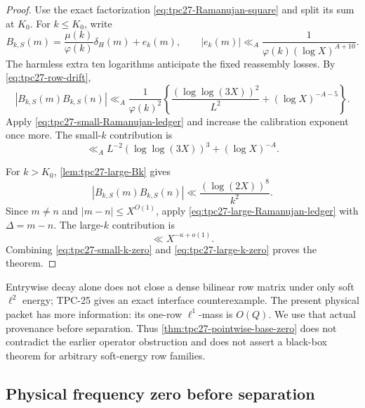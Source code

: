 \begin{proof}
Use the exact factorization
\eqref{eq:tpc27-Ramanujan-square} and split its sum at \(K_0\).
For \(k\le K_0\), write
\begin{equation}
 B_{k,S}(m)=
 \frac{\mu(k)}{\varphi(k)}\delta_H(m)+e_k(m),
 \qquad
 |e_k(m)|\ll_A
 \frac1{\varphi(k)(\log X)^{A+10}}.
 \label{eq:tpc27-small-B-error}
\end{equation}
The harmless extra ten logarithms anticipate the fixed reassembly
losses.  By \eqref{eq:tpc27-row-drift},
\begin{equation}
 |B_{k,S}(m)B_{k,S}(n)|
 \ll_A\frac1{\varphi(k)^2}
 \left\{
 \frac{(\log\log(3X))^2}{L^2}
 +(\log X)^{-A-5}
 \right\}.
 \label{eq:tpc27-small-product}
\end{equation}
Apply \eqref{eq:tpc27-small-Ramanujan-ledger} and increase the
calibration exponent once more.  The small-\(k\) contribution is
\begin{equation}
 \ll_A
 L^{-2}(\log\log(3X))^3+(\log X)^{-A}.
 \label{eq:tpc27-small-k-zero}
\end{equation}

For \(k>K_0\), \cref{lem:tpc27-large-Bk} gives
\begin{equation}
 |B_{k,S}(m)B_{k,S}(n)|
 \ll\frac{(\log(2X))^8}{k^2}.
 \label{eq:tpc27-large-product}
\end{equation}
Since \(m\ne n\) and \(|m-n|\le X^{O(1)}\), apply
\eqref{eq:tpc27-large-Ramanujan-ledger} with
\(\Delta=m-n\).  The large-\(k\) contribution is
\begin{equation}
 \ll X^{-\kappa+o(1)}.
 \label{eq:tpc27-large-k-zero}
\end{equation}
Combining \eqref{eq:tpc27-small-k-zero} and
\eqref{eq:tpc27-large-k-zero} proves the theorem.
\end{proof}

\begin{remark}
\label{rem:tpc27-no-zero-operator}
Entrywise decay alone does not close a dense bilinear row matrix under
only soft \(\ell^2\) energy; TPC-25 gives an exact interface
counterexample.  The present physical packet has more information: its
one-row \(\ell^1\)-mass is \(O(Q)\).  We use that actual provenance
before separation.  Thus \cref{thm:tpc27-pointwise-base-zero} does not
contradict the earlier operator obstruction and does not assert a
black-box theorem for arbitrary soft-energy row families.
\end{remark}

\subsection{Physical frequency zero before separation}

